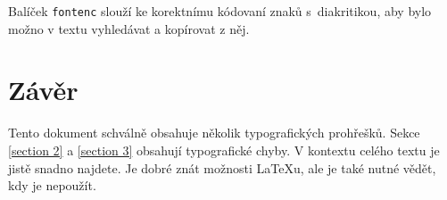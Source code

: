 \documentclass[a4paper, 10pt, twocolumn]{article}
\begin{document}
Balíček \texttt{fontenc} slouží ke korektnímu kódovaní znaků s~diakritikou, aby bylo možno v textu vyhledávat a kopírovat z něj.

\section{Závěr}
\label{section 5}
Tento dokument schválně obsahuje několik typografických prohřešků.
Sekce \ref{section 2} a \ref{section 3} obsahují typografické chyby.
V kontextu celého textu je jistě snadno najdete.
Je dobré znát možnosti \LaTeX u, ale je také nutné vědět, kdy je nepoužít.
\end{document}
